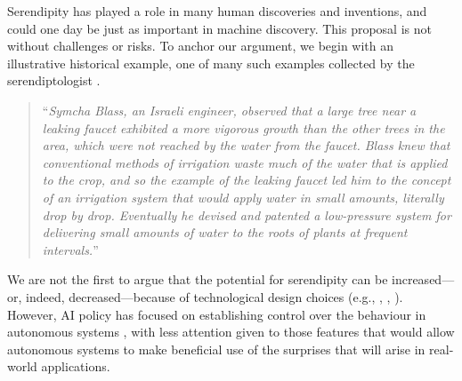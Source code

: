 Serendipity has played a role in many human discoveries and inventions, and could one day be just as important in machine discovery.  This proposal is not without challenges or risks.
To anchor our argument, we begin with an illustrative historical example, one of many such examples collected by the serendiptologist \citet{van1994anatomy}.

\begin{quote}
``\emph{Symcha Blass, an Israeli engineer, observed that a large tree near a leaking faucet exhibited a more vigorous growth than the other trees in the area, which were not reached by the water from the faucet.  Blass knew that conventional methods of irrigation waste much of the water that is applied to the crop, and so the example of the leaking faucet led him to the concept of an irrigation system that would apply water in small amounts, literally drop by drop. Eventually he devised and patented a low-pressure system for delivering small amounts of water to the roots of plants at frequent intervals.}'' \cite{shoji1977drip} 
\end{quote}

We are not the first to argue that the potential for
serendipity can be increased---or, indeed, decreased---because of
technological design choices (e.g., \cite{danzico2010design},
\cite{newman2002designing}, \cite{melo2018}).
However, AI policy has focused on establishing control over the
behaviour in autonomous systems \cite{research-priorities}, with less
attention given to those features that would allow autonomous systems
to make beneficial use of the surprises that will arise in real-world
applications.





